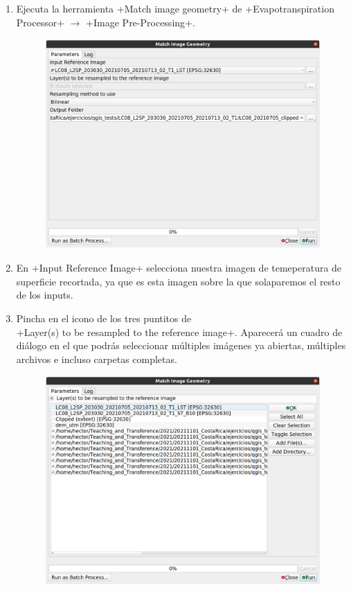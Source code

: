 \documentclass[a4paper,11pt]{article}
\begin{document}
    \begin{enumerate}
     \item Ejecuta la herramienta \cverb+Match image geometry+ de \cverb+Evapotranspiration Processor+ $\rightarrow$ \cverb+Image Pre-Processing+.
     
     \begin{figure}[H]\centering
      \includegraphics[width=\textwidth]{qgis_match_image_geometry}
     \end{figure}
     
     \item En \cverb+Input Reference Image+ selecciona nuestra imagen de temeperatura de superficie recortada, ya que es esta imagen sobre la que solaparemos el resto de los inputs.
     
     \item Pincha en el icono de los tres puntitos de\\ \cverb+Layer(s) to be resampled to the reference image+. Aparecerá un cuadro de diálogo en el que podrás seleccionar múltiples imágenes ya abiertas, múltiples archivos e incluso carpetas completas.
     
      \begin{figure}[H]\centering
      \includegraphics[width=\textwidth]{qgis_multiplefileselector}
     \end{figure}
      

\end{enumerate}
\end{document}
